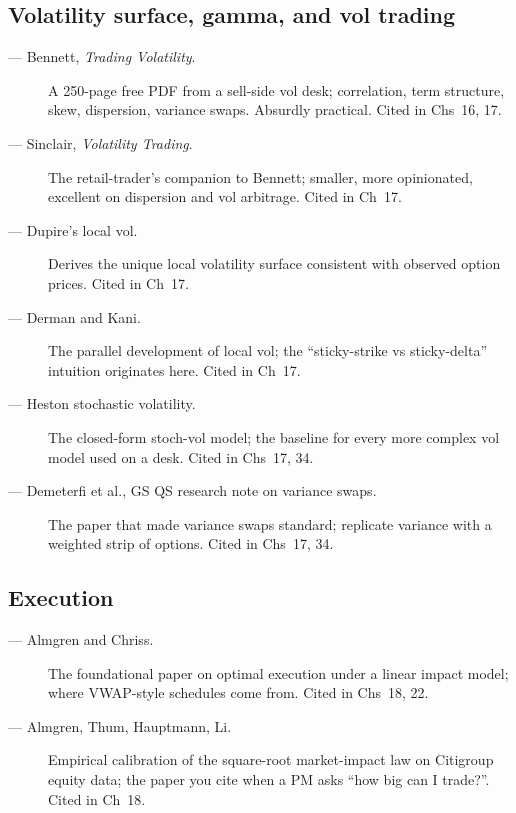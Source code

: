 \subsection{Volatility surface, gamma, and vol trading}

\begin{description}
  \item[\citet{bennett2014trading} --- Bennett, \emph{Trading
    Volatility}.] A 250-page free PDF from a sell-side vol desk;
    correlation, term structure, skew, dispersion, variance swaps.
    Absurdly practical. Cited in Chs~16, 17.
  \item[\citet{sinclair2013volatility} --- Sinclair, \emph{Volatility
    Trading}.] The retail-trader's companion to Bennett; smaller,
    more opinionated, excellent on dispersion and vol arbitrage.
    Cited in Ch~17.
  \item[\citet{dupire1994pricing} --- Dupire's local vol.] Derives
    the unique local volatility surface consistent with observed
    option prices. Cited in Ch~17.
  \item[\citet{derman1994riding} --- Derman and Kani.] The parallel
    development of local vol; the ``sticky-strike vs sticky-delta''
    intuition originates here. Cited in Ch~17.
  \item[\citet{heston1993closed} --- Heston stochastic volatility.]
    The closed-form stoch-vol model; the baseline for every more
    complex vol model used on a desk. Cited in Chs~17, 34.
  \item[\citet{demeterfi1999guide} --- Demeterfi et al., GS QS
    research note on variance swaps.] The paper that made variance
    swaps standard; replicate variance with a weighted strip of
    options. Cited in Chs~17, 34.
\end{description}

\subsection{Execution}

\begin{description}
  \item[\citet{almgren2000optimal} --- Almgren and Chriss.] The
    foundational paper on optimal execution under a linear impact
    model; where VWAP-style schedules come from. Cited in Chs~18,
    22.
  \item[\citet{almgren2005direct} --- Almgren, Thum, Hauptmann, Li.]
    Empirical calibration of the square-root market-impact law on
    Citigroup equity data; the paper you cite when a PM asks ``how
    big can I trade?''. Cited in Ch~18.
\end{description}

